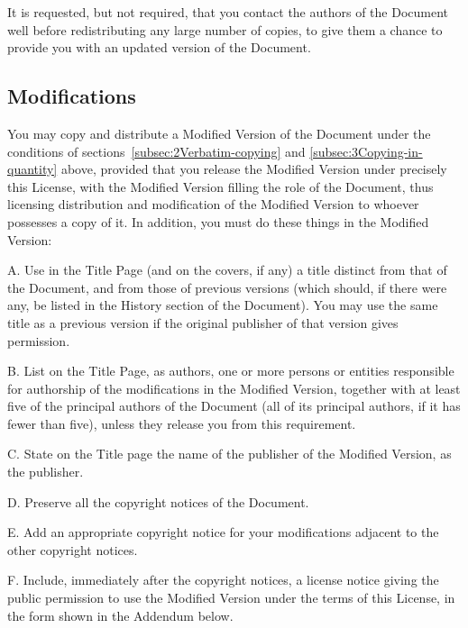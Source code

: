 {\tiny{}It is requested, but not required, that you contact the authors
of the Document well before redistributing any large number of copies,
to give them a chance to provide you with an updated version of the
Document.}{\tiny\par}

\subsection{Modifications\label{subsec:4Modifications}}

{\tiny{}You may copy and distribute a Modified Version of the Document
under the conditions of sections~\ref{subsec:2Verbatim-copying}
and \ref{subsec:3Copying-in-quantity} above, provided that you release
the Modified Version under precisely this License, with the Modified
Version filling the role of the Document, thus licensing distribution
and modification of the Modified Version to whoever possesses a copy
of it. In addition, you must do these things in the Modified Version:}{\tiny\par}

{\tiny{}A. Use in the Title Page (and on the covers, if any) a title
distinct from that of the Document, and from those of previous versions
(which should, if there were any, be listed in the History section
of the Document). You may use the same title as a previous version
if the original publisher of that version gives permission.}{\tiny\par}

{\tiny{}B. List on the Title Page, as authors, one or more persons
or entities responsible for authorship of the modifications in the
Modified Version, together with at least five of the principal authors
of the Document (all of its principal authors, if it has fewer than
five), unless they release you from this requirement.}{\tiny\par}

{\tiny{}C. State on the Title page the name of the publisher of the
Modified Version, as the publisher.}{\tiny\par}

{\tiny{}D. Preserve all the copyright notices of the Document.}{\tiny\par}

{\tiny{}E. Add an appropriate copyright notice for your modifications
adjacent to the other copyright notices.}{\tiny\par}

{\tiny{}F. Include, immediately after the copyright notices, a license
notice giving the public permission to use the Modified Version under
the terms of this License, in the form shown in the Addendum below.}{\tiny\par}

